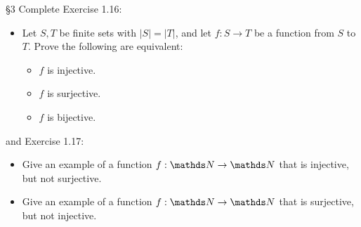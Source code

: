 \documentclass{homework}
\begin{document}
\begin{problem}{\S 3}
  Complete Exercise 1.16:
  \begin{itemize}
    \item Let $S, T$ be finite sets with $\left| S \right| =\left| T \right| $, and let $f: S \to
      T$ be a function from $S$ to $T$. Prove the following are equivalent:
      \begin{itemize}
        \item $f$ is injective.
        \item $f$ is surjective.
        \item $f$ is bijective.
      \end{itemize}
  \end{itemize}
  and Exercise 1.17:
  \begin{itemize}
    \item Give an example of a function $f: \N \to \N$ that is injective, but not surjective.
    \item Give an example of a function $f: \N \to \N$ that is surjective, but not injective.
  \end{itemize}
\end{problem}
\end{document}

